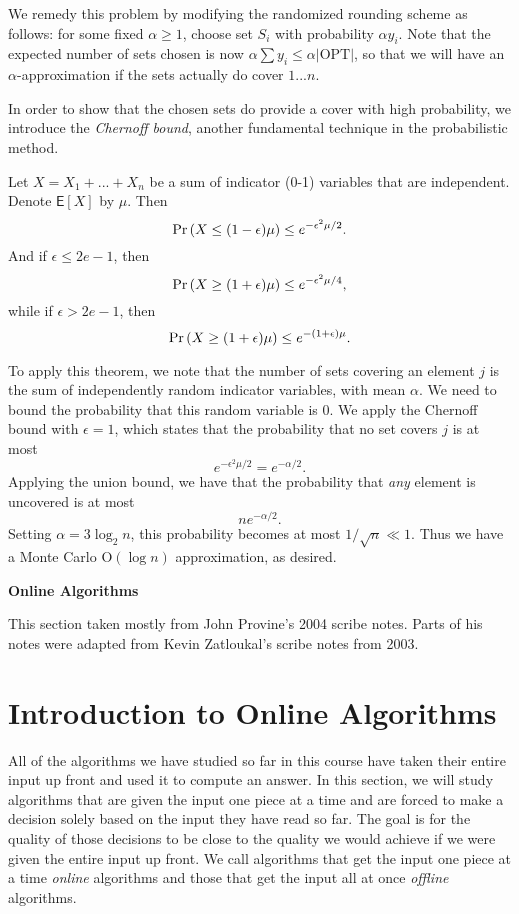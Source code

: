 \documentclass{article}
\renewcommand{\Pr}[1]{\textrm{\textup{Pr}}\left( #1 \right)}
\newcommand{\E}{\mbox{$\mathsf E$}}
\begin{document}
We remedy this problem by modifying the randomized rounding scheme as follows: for some fixed $\alpha\geq 1$, choose set $S_i$ with probability $\alpha y_i$.  Note that the expected number of sets chosen is now $\alpha\sum y_i\leq \alpha |\textrm{OPT}|$, so that we will have an $\alpha$-approximation if the sets actually do cover $1...n$.

In order to show that the chosen sets do provide a cover with high probability, we introduce the \emph{Chernoff bound}, another fundamental technique in the probabilistic method.

\begin{theorem}
Let $X=X_1+...+X_n$ be a sum of indicator (0-1) variables that are independent.  Denote $\E[X]$ by $\mu$.  Then $$\Pr{X\leq(1-\epsilon)\mu}\leq e^{-\epsilon^2\mu/2}.$$
And if $\epsilon\leq 2e-1$, then $$\Pr{X\geq(1+\epsilon)\mu}\leq e^{-\epsilon^2\mu/4},$$
while if $\epsilon>2e-1$, then $$\Pr{X\geq(1+\epsilon)\mu}\leq e^{-(1+\epsilon)\mu}.$$
\end{theorem}
To apply this theorem, we note that the number of sets covering an element $j$ is the sum of independently random indicator variables, with mean $\alpha$.  We need to bound the probability that this random variable is 0.  We apply the Chernoff bound with $\epsilon=1$, which states that the probability that no set covers $j$ is at most $$e^{-\epsilon^2\mu/2}=e^{-\alpha/2}.$$
Applying the union bound, we have that the probability that \emph{any} element is uncovered is at most $$ne^{-\alpha/2}.$$  Setting $\alpha=3\log_2 n$, this probability becomes at most $1/\sqrt{n}\ll 1$.  Thus we have a Monte Carlo $\textrm{O}(\log n)$ approximation, as desired.

\begin{center}
{\large \bf Online Algorithms}
\end{center}

This section taken mostly from John Provine's 2004 scribe notes. Parts of his notes were  adapted from Kevin Zatloukal's scribe notes from 2003.

\section{Introduction to Online Algorithms}

All of the algorithms we have studied so far in this course have
taken their entire input up front and used it to compute an
answer. In this section, we will study algorithms that are given
the input one piece at a time and are forced to make a decision
solely based on the input they have read so far. The goal is for
the quality of those decisions to be close to the quality we would
achieve if we were given the entire input up front. We call
algorithms that get the input one piece at a time \emph{online}
algorithms and those that get the input all at once \emph{offline}
algorithms.
\end{document}
